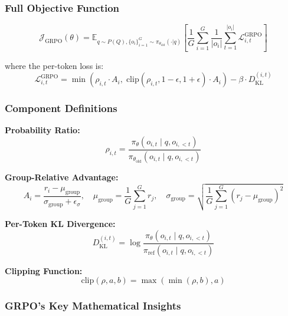 \documentclass[11pt,a4paper]{article}
\begin{document}
\subsubsection{Full Objective Function}

\begin{equation}
\mathcal{J}_{\text{GRPO}}(\theta) = \mathbb{E}_{q \sim P(Q), \{o_i\}_{i=1}^G \sim \pi_{\theta_{\text{old}}}(\cdot|q)} \left[ \frac{1}{G} \sum_{i=1}^{G} \frac{1}{|o_i|} \sum_{t=1}^{|o_i|} \mathcal{L}_{i,t}^{\text{GRPO}} \right]
\end{equation}

where the per-token loss is:
\begin{equation}
\mathcal{L}_{i,t}^{\text{GRPO}} = \min\left( \rho_{i,t} \cdot A_i, \; \text{clip}(\rho_{i,t}, 1-\epsilon, 1+\epsilon) \cdot A_i \right) - \beta \cdot D_{\text{KL}}^{(i,t)}
\end{equation}

\subsubsection{Component Definitions}

\textbf{Probability Ratio:}
\begin{equation}
\rho_{i,t} = \frac{\pi_{\theta}(o_{i,t} \mid q, o_{i,<t})}{\pi_{\theta_{\text{old}}}(o_{i,t} \mid q, o_{i,<t})}
\end{equation}

\textbf{Group-Relative Advantage:}
\begin{equation}
A_i = \frac{r_i - \mu_{\text{group}}}{\sigma_{\text{group}} + \epsilon_{\sigma}}, \quad
\mu_{\text{group}} = \frac{1}{G} \sum_{j=1}^{G} r_j, \quad
\sigma_{\text{group}} = \sqrt{\frac{1}{G} \sum_{j=1}^{G} (r_j - \mu_{\text{group}})^2}
\end{equation}

\textbf{Per-Token KL Divergence:}
\begin{equation}
D_{\text{KL}}^{(i,t)} = \log \frac{\pi_{\theta}(o_{i,t} \mid q, o_{i,<t})}{\pi_{\text{ref}}(o_{i,t} \mid q, o_{i,<t})}
\end{equation}

\textbf{Clipping Function:}
\begin{equation}
\text{clip}(\rho, a, b) = \max(\min(\rho, b), a)
\end{equation}

\subsubsection{GRPO's Key Mathematical Insights}
\end{document}
